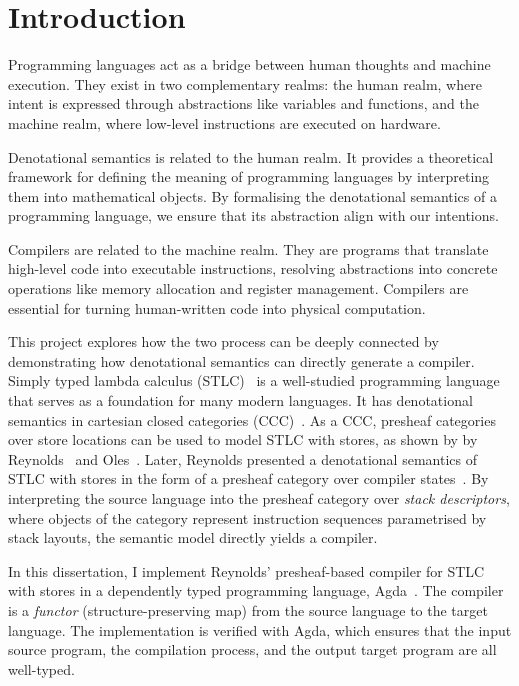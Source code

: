 \documentclass[12pt,a4paper]{report}
\makeatletter
\theoremstyle{definition}
\newcommand{\frontmatter}{
  \pagenumbering{roman}
}
\newcommand{\mainmatter}{
  \cleardoublepage
  \pagenumbering{arabic}
  \setcounter{page}{1}
}
\newcommand{\chapterminitoc}{%
  \begingroup
    \let\ps@plain\ps@empty %
    \let\ps@headings\ps@empty
    \minitoc
    \thispagestyle{empty} %
    \afterpage{\clearpage} %
  \endgroup
    \clearpage
  \addtocounter{page}{-1} %
}
\makeatother
\begin{document}
\frontmatter
\tableofcontents
\newpage

\mainmatter
\chapter{Introduction}
    \chapterminitoc
    Programming languages act as a bridge between human thoughts and machine execution. They exist in two complementary realms: the human realm, where intent is expressed through abstractions like variables and functions, and the machine realm, where low-level instructions are executed on hardware. 

    Denotational semantics is related to the human realm. It provides a theoretical framework for defining the meaning of programming languages by interpreting them into mathematical objects. By formalising the denotational semantics of a programming language, we ensure that its abstraction align with our intentions.

    Compilers are related to the machine realm. They are programs that translate high-level code into executable instructions, resolving abstractions into concrete operations like memory allocation and register management. Compilers are essential for turning human-written code into physical computation.

    This project explores how the two process can be deeply connected by demonstrating how denotational semantics can directly generate a compiler. Simply typed lambda calculus (STLC)~\autocite{stlc} is a well-studied programming language that serves as a foundation for many modern languages. It has denotational semantics in cartesian closed categories (CCC)~\autocite{lambek}. As a CCC, presheaf categories over store locations can be used to model STLC with stores, as shown by by Reynolds~\autocite{essence} and Oles~\autocite{Oles_1,Oles_2}. Later, Reynolds presented a denotational semantics of STLC with stores in the form of a presheaf category over compiler states~\autocite{Reynolds}. By interpreting the source language into the presheaf category over \emph{stack descriptors}, where objects of the category represent instruction sequences parametrised by stack layouts, the semantic model directly yields a compiler. 
    
    In this dissertation, I implement Reynolds' presheaf-based compiler for STLC with stores in a dependently typed programming language, Agda~\autocite{Agda}. The compiler is a \emph{functor} (structure-preserving map) from the source language to the target language. The implementation is verified with Agda, which ensures that the input source program, the compilation process, and the output target program are all well-typed.
\end{document}
